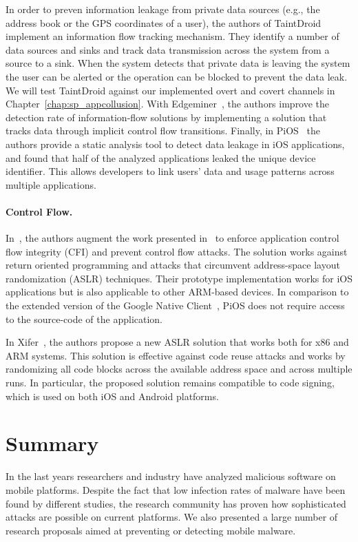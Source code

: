In order to preven information leakage from private data sources (e.g., the address book or the GPS coordinates of a user), the authors of TaintDroid~\cite{taintdroid} implement an information flow tracking mechanism. They identify a number of data sources and sinks and track data transmission across the system from a source to a sink. When the system detects that private data is leaving the system the user can be alerted or the operation can be blocked to prevent the data leak. We will test TaintDroid against our implemented overt and covert channels in Chapter~\ref{chap:sp_appcollusion}. With Edgeminer~\cite{edgeminer}, the authors improve the detection rate of information-flow solutions by implementing a solution that tracks data through implicit control flow transitions. Finally, in PiOS~\cite{pios} the authors provide a static analysis tool to detect data leakage in iOS applications, and found that half of the analyzed applications leaked the unique device identifier. This allows developers to link users' data and usage patterns across multiple applications.

\paragraph{Control Flow.}
In~\cite{mocfi}, the authors augment the work presented in~\cite{pios} to enforce application control flow integrity (CFI) and prevent control flow attacks. The solution works against return oriented programming and attacks that circumvent address-space layout randomization (ASLR) techniques. Their prototype implementation works for iOS applications but is also applicable to other ARM-based devices. In comparison to the extended version of the Google Native Client~\cite{naclusenix}, PiOS does not require access to the source-code of the application.

In Xifer~\cite{xifer}, the authors propose a new ASLR solution that works both for x86 and ARM systems. This solution is effective against code reuse attacks and works by randomizing all code blocks across the available address space and across multiple runs. In particular, the proposed solution remains compatible to code signing, which is used on both iOS and Android platforms.

\section{Summary}

In the last years researchers and industry have analyzed malicious software on mobile platforms. Despite the fact that low infection rates of malware have been found by different studies, the research community has proven how sophisticated attacks are possible on current platforms. We also presented a large number of research proposals aimed at preventing or detecting mobile malware.

